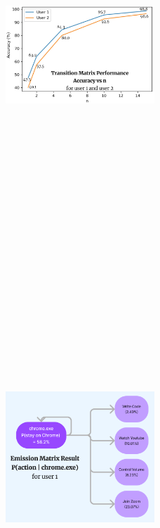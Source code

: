\documentclass[final]{beamer}
\newlength{\colwidth}
\begin{document}
\begin{frame}[t]
\begin{columns}[t]
\begin{column}{\colwidth}
\begin{block}
      \begin{figure}
        \includegraphics[width=0.5\textwidth, height=15cm]{transition-mt.jpeg}
        \hspace{\fill}
        \includegraphics[width=0.5\textwidth, height=15cm]{emission-mt.jpeg}
        \end{figure}


\end{block}
\end{column}
\end{columns}
\end{frame}
\end{document}
